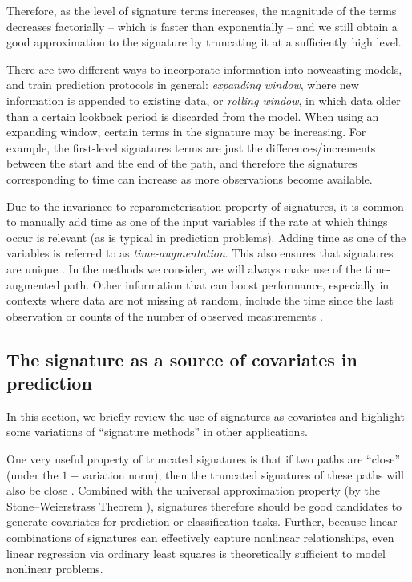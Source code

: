 \documentclass[a4paper, 12pt]{article}
\theoremstyle{remark}
\begin{document}
Therefore, as the level of signature terms increases, the magnitude of the terms decreases factorially -- which is faster than exponentially -- and we still obtain a good approximation to the signature by truncating it at a sufficiently high level.

There are two different ways to incorporate information into nowcasting models, and train prediction protocols in general: \textit{expanding window}, where new information is appended to existing data, or \textit{rolling window}, in which data older than a certain lookback period is discarded from the model. When using an expanding window, certain terms in the signature may be increasing. For example, the first-level signatures terms are just the differences/increments between the start and the end of the path, and therefore the signatures corresponding to time can increase as more observations become available.


Due to the invariance to reparameterisation property of signatures, it is common to manually add time as one of the input variables if the rate at which things occur is relevant (as is typical in prediction problems). Adding time as one of the variables is referred to as \textit{time-augmentation}. This also ensures that signatures are unique \citep{hambly2010uniqueness}. In the methods we consider, we will always make use of the time-augmented path. Other information that can boost performance, especially in contexts where data are not missing at random, include the time since the last observation or counts of the number of observed measurements \citep{morrill2022onthe}.

\subsection{The signature as a source of covariates in prediction}\label{sec:sigprediction}

In this section, we briefly review the use of signatures as covariates and highlight some variations of ``signature methods'' in other applications.

One very useful property of truncated signatures is that if two paths are ``close'' (under the $1-$variation norm), then the truncated signatures of these paths will also be close \citep{giusti2020iterated}.
Combined with the universal approximation property (by the Stone--Weierstrass Theorem \citep{levin2013learning}), signatures therefore should be good candidates to generate covariates for prediction or classification tasks. Further, because linear combinations of signatures can effectively capture nonlinear relationships, even linear regression via ordinary least squares is theoretically sufficient to model nonlinear problems.
\end{document}
